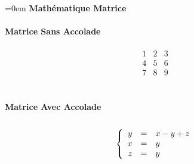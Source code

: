 \documentclass{article}
\begin{document}
\parindent=0em
\textbf{Mathématique Matrice} \\ \\
\textbf{Matrice Sans Accolade} \\ \\
$$\begin{matrix}
1 & 2 & 3 \\
4 & 5 & 6 \\
7 & 8 & 9
\end{matrix}$$ \\ \\
\textbf{Matrice Avec Accolade} \\ \\
$$\left \{
\begin{array}{r c l}
y &=& x - y + z\\
x &=& y\\
z &=& y
\end{array}
\right.$$ \\ \\
\end{document}
